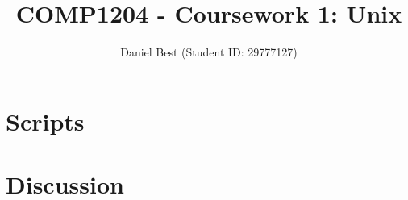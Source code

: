 \documentclass{article}
\title{COMP1204 - Coursework 1: Unix}
\author{Daniel Best (Student ID: 29777127)}
\begin{document}
	
	\maketitle
	
	\newpage
	\section{Scripts}
	\section{Discussion}
	
\end{document}
